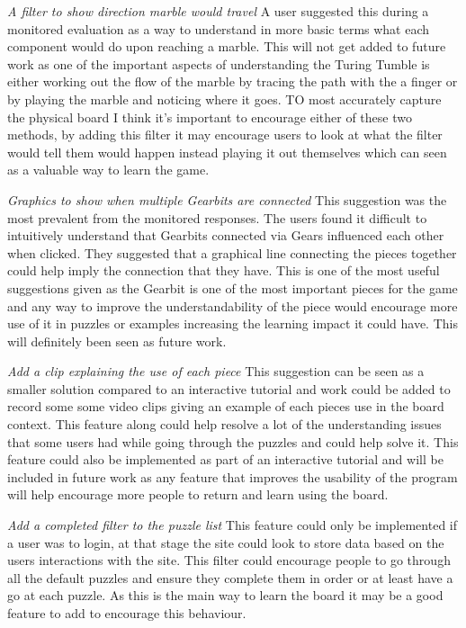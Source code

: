\documentclass{l4proj}
\begin{document}
\emph{A filter to show direction marble would travel}
A user suggested this during a monitored evaluation as a way to understand in more basic terms what each component would do upon reaching a marble. This will not get added to future work as one of the important aspects of understanding the Turing Tumble is either working out the flow of the marble by tracing the path with the a finger or by playing the marble and noticing where it goes. TO most accurately capture the physical board I think it's important to encourage either of these two methods, by adding this filter it may encourage users to look at what the filter would tell them would happen instead playing it out themselves which can seen as a valuable way to learn the game.

\emph{Graphics to show when multiple Gearbits are connected}
This suggestion was the most prevalent from the monitored responses. The users found it difficult to intuitively understand that Gearbits connected via Gears influenced each other when clicked. They suggested that a graphical line connecting the pieces together could help imply the connection that they have. This is one of the most useful suggestions given as the Gearbit is one of the most important pieces for the game and any way to improve the understandability of the piece would encourage more use of it in puzzles or examples increasing the learning impact it could have. This will definitely been seen as future work.

\emph{Add a clip explaining the use of each piece}
This suggestion can be seen as a smaller solution compared to an interactive tutorial and work could be added to record some some video clips giving an example of each pieces use in the board context. This feature along could help resolve a lot of the understanding issues that some users had while going through the puzzles and could help solve it. This feature could also be implemented as part of an interactive tutorial and will be included in future work as any feature that improves the usability of the program will help encourage more people to return and learn using the board.

\emph{Add a completed filter to the puzzle list}
This feature could only be implemented if a user was to login, at that stage the site could look to store data based on the users interactions with the site. This filter could encourage people to go through all the default puzzles and ensure they complete them in order or at least have a go at each puzzle. As this is the main way to learn the board it may be a good feature to add to encourage this behaviour. 
\end{document}
